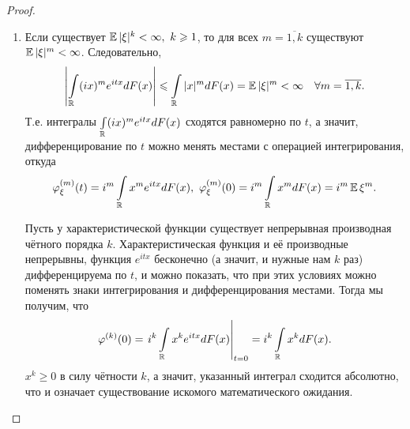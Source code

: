 \begin{proof}
\begin{enumerate}
            После этого выберем $h$ столь малым, чтобы $\left|e^{i h x}-1\right|<\frac{\varepsilon}{2}~$ при всех $|x| \leqslant R$. 
            Тогда и первый интеграл не превосходит $\frac{\varepsilon}{2}$ и, таким образом, по заданному $\varepsilon > 0$ подобрано столь малое $h >0$, что ${|\varphi(t+h)-\varphi(t)|<\varepsilon~ \forall t \in \Real}$.
        \item 
            Если существует $\operatorname{\mathbb{E}} |\xi|^{k}<\infty,~ k \geqslant 1$, то для всех $m = \overline{1, k}$ существуют $\operatorname{\mathbb{E}} |\xi|^{m}<\infty$. Следовательно,
            \begin{equation*}
                \left|\int\limits_{\mathbb{R}}(i x)^{m} e^{i t x} d F(x)\right| \leqslant \int\limits_{\mathbb{R}}|x|^{m} d F(x)=\operatorname{\mathbb{E}} |\xi|^{m}<\infty \quad \forall m = \overline{1, k}.
            \end{equation*}
            Т.е. интегралы $\int\limits_{\mathbb{R}}(i x)^{m} e^{i t x} d F(x)$ сходятся равномерно по $t$, а значит, дифференцирование по $t$ можно менять местами с операцией интегрирования, откуда
            \begin{equation*}
                \varphi_{\xi}^{(m)}(t)=i^{m} \int\limits_{\mathbb{R}} x^{m} e^{i t x} d F(x),~ \varphi_{\xi}^{(m)}(0)=i^{m} \int\limits_{\mathbb{R}} x^{m} d F(x)=i^{m} \operatorname{\mathbb{E}} \xi^{m}.
            \end{equation*}
            
            Пусть у характеристической функции существует непрерывная производная чётного порядка $k$. 
            Характеристическая функция и её производные непрерывны, функция $e^{itx}$ бесконечно (а значит, и нужные нам $k$ раз) дифференцируема по $t$, 
            и можно показать, что при этих условиях можно поменять знаки интегрирования и дифференцирования местами.
            Тогда мы получим, что
            \begin{equation*}
                \varphi^{(k)}(0) = \left.i^k \int\limits_{\mathbb{R}} x^k e^{itx} dF(x)\right|_{t=0} = i^k \int\limits_{\mathbb{R}} x^k dF(x).
            \end{equation*}
            $x^k \geqslant 0$ в силу чётности $k$, а значит, указанный интеграл сходится абсолютно, что и означает существование искомого математического ожидания.
            \qedhere
    \end{enumerate}
\end{proof}
